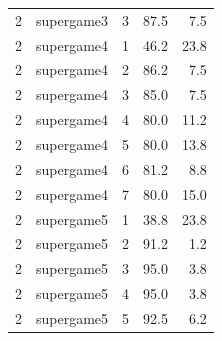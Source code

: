 \begin{tabular}{clcrr}
  2 & supergame3 & 3 & 87.5 & 7.5 \\ 
  2 & supergame4 & 1 & 46.2 & 23.8 \\ 
  2 & supergame4 & 2 & 86.2 & 7.5 \\ 
  2 & supergame4 & 3 & 85.0 & 7.5 \\ 
  2 & supergame4 & 4 & 80.0 & 11.2 \\ 
  2 & supergame4 & 5 & 80.0 & 13.8 \\ 
  2 & supergame4 & 6 & 81.2 & 8.8 \\ 
  2 & supergame4 & 7 & 80.0 & 15.0 \\ 
  2 & supergame5 & 1 & 38.8 & 23.8 \\ 
  2 & supergame5 & 2 & 91.2 & 1.2 \\ 
  2 & supergame5 & 3 & 95.0 & 3.8 \\ 
  2 & supergame5 & 4 & 95.0 & 3.8 \\ 
  2 & supergame5 & 5 & 92.5 & 6.2 \\ 
  \bottomrule
\end{tabular}
